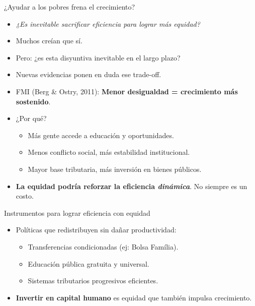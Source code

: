 \documentclass{beamer}
\begin{document}
\begin{frame}{¿Ayudar a los pobres frena el crecimiento?}
    \begin{itemize}
        \item \textit{¿Es inevitable sacrificar eficiencia para lograr más equidad?} \pause
        \item Muchos creían que sí.
        \item Pero: ¿es esta disyuntiva inevitable en el largo plazo?
        \item Nuevas evidencias ponen en duda ese trade-off. \pause
        \item FMI (Berg \& Ostry, 2011): \textbf{Menor desigualdad = crecimiento más sostenido}.
        \item ¿Por qué?
        \begin{itemize}
            \item Más gente accede a educación y oportunidades.
            \item Menos conflicto social, más estabilidad institucional.
            \item Mayor base tributaria, más inversión en bienes públicos.
        \end{itemize}
        \item \textbf{La equidad podría reforzar la eficiencia \textit{dinámica}}. No siempre es un costo.
    \end{itemize}
\end{frame}

\begin{frame}{Instrumentos para lograr eficiencia con equidad}
    \begin{itemize}
        \item Políticas que redistribuyen sin dañar productividad:
        \begin{itemize}
            \item Transferencias condicionadas (ej: Bolsa Família).
            \item Educación pública gratuita y universal.
            \item Sistemas tributarios progresivos eficientes.
        \end{itemize}
        \item \textbf{Invertir en capital humano} es equidad que también impulsa crecimiento.
    \end{itemize}
\end{frame}
\end{document}
